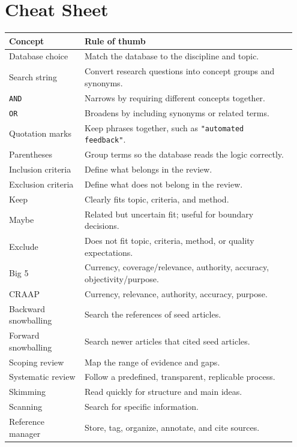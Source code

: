 \documentclass[11pt,letterpaper]{article}
\begin{document}
\section{Cheat Sheet}

\begin{longtable}{@{}p{0.25\linewidth}p{0.70\linewidth}@{}}
\toprule
\textbf{Concept} & \textbf{Rule of thumb}\\
\midrule
Database choice & Match the database to the discipline and topic.\\
Search string & Convert research questions into concept groups and synonyms.\\
\texttt{AND} & Narrows by requiring different concepts together.\\
\texttt{OR} & Broadens by including synonyms or related terms.\\
Quotation marks & Keep phrases together, such as \texttt{"automated feedback"}.\\
Parentheses & Group terms so the database reads the logic correctly.\\
Inclusion criteria & Define what belongs in the review.\\
Exclusion criteria & Define what does not belong in the review.\\
Keep & Clearly fits topic, criteria, and method.\\
Maybe & Related but uncertain fit; useful for boundary decisions.\\
Exclude & Does not fit topic, criteria, method, or quality expectations.\\
Big 5 & Currency, coverage/relevance, authority, accuracy, objectivity/purpose.\\
CRAAP & Currency, relevance, authority, accuracy, purpose.\\
Backward snowballing & Search the references of seed articles.\\
Forward snowballing & Search newer articles that cited seed articles.\\
Scoping review & Map the range of evidence and gaps.\\
Systematic review & Follow a predefined, transparent, replicable process.\\
Skimming & Read quickly for structure and main ideas.\\
Scanning & Search for specific information.\\
Reference manager & Store, tag, organize, annotate, and cite sources.\\
\bottomrule
\end{longtable}
\end{document}
